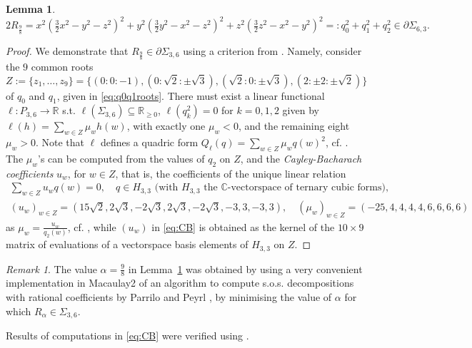 \documentclass[a4paper,twoside,reqno]{amsart}
\newcommand{\RR}{\mathbb{R}}
\newcommand{\SosHF}[2]{\Sigma_{{#2},{#1}}}
\newcommand{\PH}[2]{P_{{#1},{#2}}}
\newcommand{\SosH}[2]{\Sigma_{{#1},{#2}}}
\theoremstyle{plain}
\newtheorem{lem}[prop]{Lemma}
\theoremstyle{definition}
\theoremstyle{remark}
\newtheorem{rem}[prop]{Remark}
\begin{document}
\begin{lem}\label{lem:robinson}
  $2R_{\frac{9}{8}}=x^2(\frac{3}{2}x^2-y^2-z^2)^2+y^2(\frac{3}{2}y^2-x^2-z^2)^2+z^2(\frac{3}{2}z^2-x^2-y^2)^2=:q_0^2+q_1^2+q_2^2\in\partial\SosHF{3}{6}.$
\end{lem}
\begin{proof}
We demonstrate that $R_{\frac{9}{8}}\in\partial\SosH{3}{6}$ using a criterion from \cite{MR2904568}. Namely, consider the $9$ common roots
\begin{equation}\label{eq:q0q1roots}
Z:=\{z_1,\dots,z_9\}=\{(0:0:-1),(0:\sqrt{2}:\pm\sqrt{{3}}), (\sqrt{2}:0:\pm\sqrt{{3}}),
         (2:\pm 2:\pm {\sqrt{2}})\}
\end{equation}
of $q_0$ and $q_1$, given in \eqref{eq:q0q1roots}. There must exist a linear functional
$\ell:\PH{3}{6}\to \RR$ s.t. $\ell(\SosH{3}{6})\subseteq\RR_{\geq 0}$, $\ell(q_k^2)=0$ for $k=0,1,2$ given by $\ell(h)=\sum_{w\in Z}\mu_w h(w)$, with exactly one $\mu_w<0$, and the remaining eight $\mu_w>0$. Note that $\ell$ defines a quadric form $Q_{\ell}(q)=\sum_{w\in Z}\mu_w q(w)^2$, cf. \cite[Theorem~6.1]{MR2904568}.
The $\mu_w$'s can be computed from the values of $q_2$ on $Z$, and the 
\emph{Cayley-Bacharach coefficients} $u_w$, for $w\in Z$, that is, the coefficients
of the unique linear relation
\begin{multline}\label{eq:CB}
   \sum_{w\in Z}u_w q(w)=0, \quad 
   q\in H_{3,3}\text{ (with $H_{3,3}$ the $\mathbb{C}$-vectorspace of ternary cubic forms),}\\ (u_w)_{w\in Z}=(15\sqrt{2}, 2\sqrt{3}, -2\sqrt{3}, 2\sqrt{3}, -2\sqrt{3}, -3, 3, -3, 3),\quad
(\mu_w)_{w\in Z}=(-25, 4, 4, 4, 4, 6, 6, 6, 6)
\end{multline}
as $\mu_w=\frac{u_w}{q_2(w)}$, cf. \cite[Lemma~4.1]{MR2904568}, while
$(u_w)$ in \eqref{eq:CB} is obtained as the kernel of the $10\times 9$ matrix
of evaluations of a vectorspace basis elements of $H_{3,3}$ on $Z$. 
\end{proof}

\begin{rem}
The value $\alpha=\frac{9}{8}$ in Lemma~\ref{lem:robinson} was obtained by using a very convenient implementation \cite{SumsOfSquaresArticle,SumsOfSquaresSource} in Macaulay2 \cite{M2} of an algorithm to compute s.o.s. decompositions with
rational coefficients by Parrilo and Peyrl \cite{MR2474341}, by minimising the value of $\alpha$ for which $R_\alpha\in\SosH{3}{6}$. 

Results of computations in \eqref{eq:CB} were verified using \cite{sagemath}. 
\end{rem}
\end{document}
